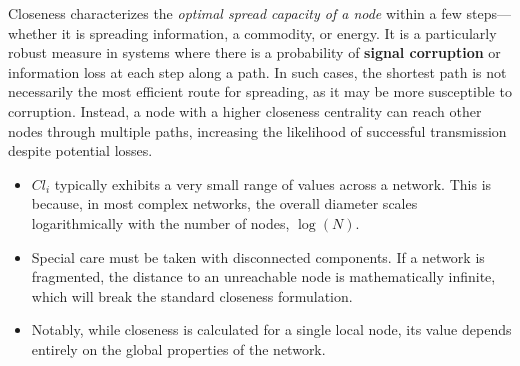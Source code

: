 Closeness characterizes the \textit{optimal spread capacity of a node} within a few steps—whether it is spreading information, a commodity, or energy. It is a particularly robust measure in systems where there is a probability of \textbf{signal corruption} or information loss at each step along a path. In such cases, the shortest path is not necessarily the most efficient route for spreading, as it may be more susceptible to corruption. Instead, a node with a higher closeness centrality can reach other nodes through multiple paths, increasing the likelihood of successful transmission despite potential losses.

\begin{remark}
    \begin{itemize}
        \item $Cl_i$ typically exhibits a very small range of values across a network. This is because, in most complex networks, the overall diameter scales logarithmically with the number of nodes, $\log(N)$.
        \item Special care must be taken with disconnected components. If a network is fragmented, the distance to an unreachable node is mathematically infinite, which will break the standard closeness formulation.
        \item Notably, while closeness is calculated for a single local node, its value depends entirely on the global properties of the network.
    \end{itemize}
\end{remark}


